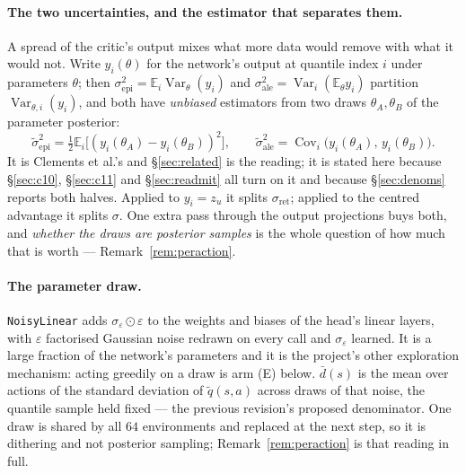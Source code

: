\documentclass{article}
\newcommand{\E}{\mathbb{E}}
\DeclareMathOperator{\Var}{Var}
\DeclareMathOperator{\Cov}{Cov}
\newcommand{\dbar}{\bar{d}}
\newcommand{\sret}{\sigma_{\mathrm{ret}}}
\newcommand{\srank}{\sigma}
\newcommand{\snoise}{\sigma_{\varepsilon}}
\begin{document}
\paragraph{The two uncertainties, and the estimator that separates them.} A spread of the
critic's output mixes what more data would remove with what it would not. Write
$y_i(\theta)$ for the network's output at quantile index $i$ under parameters $\theta$; then
$\sigma^2_{\mathrm{epi}} = \E_i \Var_\theta(y_i)$ and
$\sigma^2_{\mathrm{ale}} = \Var_i(\E_\theta y_i)$ partition $\Var_{\theta,i}(y_i)$, and both have
\emph{unbiased} estimators from two draws $\theta_A, \theta_B$ of the parameter posterior:
\begin{equation}
  \tilde{\sigma}^2_{\mathrm{epi}} = \tfrac12 \E_i\big[(y_i(\theta_A) - y_i(\theta_B))^2\big],
  \qquad
  \tilde{\sigma}^2_{\mathrm{ale}} = \Cov_i\big(y_i(\theta_A),\, y_i(\theta_B)\big).
  \label{eq:uasplit}
\end{equation}
It is Clements et al.'s and \S\ref{sec:related} is the reading; it is stated here because
\S\ref{sec:c10}, \S\ref{sec:c11} and \S\ref{sec:readmit} all turn on it and because
\S\ref{sec:denoms} reports both halves. Applied to $y_i = z_u$ it splits $\sret$; applied to
the centred advantage it splits $\srank$. One extra pass through the output projections buys
both, and \emph{whether the draws are posterior samples} is the whole question of how much that
is worth --- Remark~\ref{rem:peraction}.

\paragraph{The parameter draw.} \texttt{NoisyLinear} adds $\snoise \odot \varepsilon$ to the
weights and biases of the head's linear layers, with $\varepsilon$ factorised Gaussian noise
redrawn on every call and $\snoise$ learned. It is a large fraction of the network's parameters
and
it is the project's other exploration mechanism: acting greedily on a draw is arm (E) below.
$\dbar(s)$ is the mean over actions of the standard deviation of $\tilde{q}(s,a)$ across draws
of that noise, the quantile sample held fixed --- the previous revision's proposed denominator.
One draw is shared by all $64$ environments and replaced at the next step, so it is dithering and
not posterior sampling; Remark~\ref{rem:peraction} is that reading in full.
\end{document}
